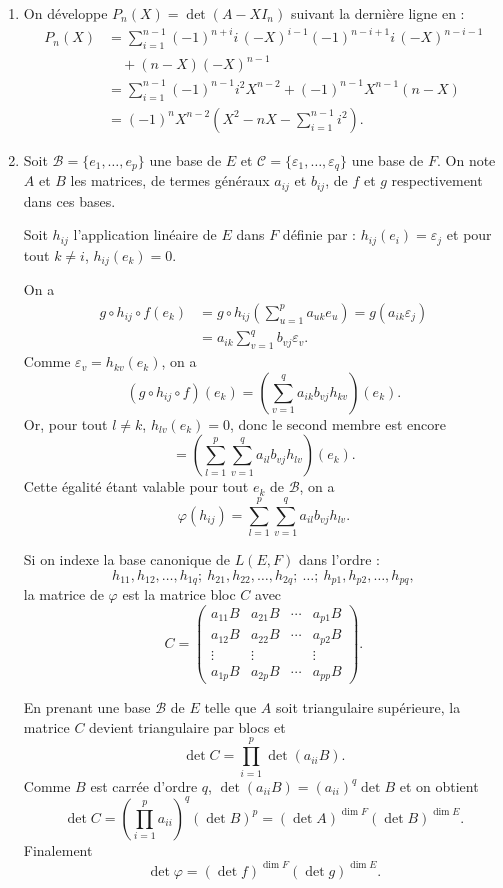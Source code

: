 \begin{enumerate}[label=\arabic*.,leftmargin=2.2em,itemsep=1.2em]
\item On développe $P_n(X)=\det(A-XI_n)$ suivant la dernière ligne en :
\[
\begin{aligned}
P_n(X)
&=\sum_{i=1}^{n-1}(-1)^{n+i}i\,(-X)^{i-1}(-1)^{n-i+1}i\,(-X)^{n-i-1}\\
&\quad +(n-X)(-X)^{n-1}\\
&=\sum_{i=1}^{n-1}(-1)^{n-1}i^2X^{n-2}+(-1)^{n-1}X^{n-1}(n-X)\\
&=(-1)^nX^{n-2}\left(X^2-nX-\sum_{i=1}^{n-1}i^2\right).
\end{aligned}
\]

\item Soit $\mathcal B=\{e_1,\ldots,e_p\}$ une base de $E$ et $\mathcal C=\{\varepsilon_1,\ldots,\varepsilon_q\}$ une base de $F$. On note $A$ et $B$ les matrices, de termes généraux $a_{ij}$ et $b_{ij}$, de $f$ et $g$ respectivement dans ces bases.

Soit $h_{ij}$ l'application linéaire de $E$ dans $F$ définie par : $h_{ij}(e_i)=\varepsilon_j$ et pour tout $k\ne i$, $h_{ij}(e_k)=0$.

On a
\[
\begin{aligned}
g\circ h_{ij}\circ f(e_k)
&=g\circ h_{ij}\left(\sum_{u=1}^p a_{uk}e_u\right)
=g(a_{ik}\varepsilon_j)\\
&=a_{ik}\sum_{v=1}^q b_{vj}\varepsilon_v.
\end{aligned}
\]
Comme $\varepsilon_v=h_{kv}(e_k)$, on a
\[
(g\circ h_{ij}\circ f)(e_k)=\left(\sum_{v=1}^q a_{ik}b_{vj}h_{kv}\right)(e_k).
\]
Or, pour tout $l\ne k$, $h_{lv}(e_k)=0$, donc le second membre est encore
\[
=\left(\sum_{l=1}^p\sum_{v=1}^q a_{il}b_{vj}h_{lv}\right)(e_k).
\]
Cette égalité étant valable pour tout $e_k$ de $\mathcal B$, on a
\[
\varphi(h_{ij})=\sum_{l=1}^p\sum_{v=1}^q a_{il}b_{vj}h_{lv}.
\]

Si on indexe la base canonique de $L(E,F)$ dans l'ordre :
\[
h_{11},h_{12},\ldots,h_{1q};\ h_{21},h_{22},\ldots,h_{2q};\ \ldots;\ h_{p1},h_{p2},\ldots,h_{pq},
\]
la matrice de $\varphi$ est la matrice bloc $C$ avec
\[
C=\begin{pmatrix}
a_{11}B&a_{21}B&\cdots&a_{p1}B\\
a_{12}B&a_{22}B&\cdots&a_{p2}B\\
\vdots&\vdots&&\vdots\\
a_{1p}B&a_{2p}B&\cdots&a_{pp}B
\end{pmatrix}.
\]

En prenant une base $\mathcal B$ de $E$ telle que $A$ soit triangulaire supérieure, la matrice $C$ devient triangulaire par blocs et
\[
\det C=\prod_{i=1}^p\det(a_{ii}B).
\]
Comme $B$ est carrée d'ordre $q$, $\det(a_{ii}B)=(a_{ii})^q\det B$ et on obtient
\[
\det C=\left(\prod_{i=1}^p a_{ii}\right)^q(\det B)^p
=(\det A)^{\dim F}(\det B)^{\dim E}.
\]
Finalement
\[
\det\varphi=(\det f)^{\dim F}(\det g)^{\dim E}.
\]


\end{enumerate}
